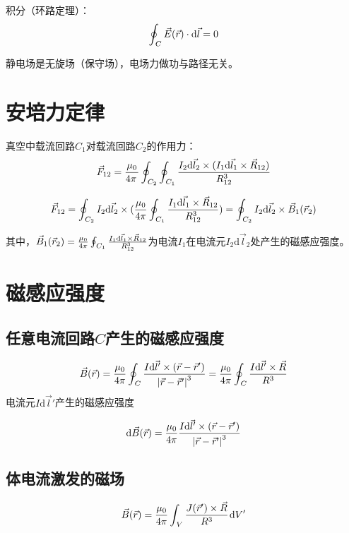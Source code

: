 积分（环路定理）：$$\oint_{{\kern 1pt} C} {\vec E{\rm{(}}\vec r{\rm{)}} \cdot {\rm{d}}\vec l}  = 0$$

静电场是无旋场（保守场），电场力做功与路径无关。


\section{安培力定律}
真空中载流回路$C_1$对载流回路$C_2$的作用力：
$${\vec F_{12}} = {{{\mu _0}} \over {4{\rm{\pi }}\,}}\oint_{{\kern 1pt} {C_2}} {\oint_{{\kern 1pt} {C_1}} {{{{I_2}{\rm{d}}{{\vec l}_2} \times ({I_1}{\rm{d}}{{\vec l}_1} \times {{\vec R}_{12}})} \over {R_{12}^3}}} } $$

$${\vec F_{12}} = \oint_{{\kern 1pt} {C_2}} {{I_2}{\rm{d}}{{\vec l}_2} \times ({{{\mu _0}} \over {4{\rm{\pi }}}}\oint_{{\kern 1pt} {C_1}} {{{{I_1}{\rm{d}}{{\vec l}_1} \times {{\vec R}_{12}}} \over {R_{12}^3}})} }  = \oint_{{\kern 1pt} {C_2}} {{I_2}{\rm{d}}{{\vec l}_2} \times {{\vec B}_1}({{\vec r}_2})} $$

其中，${\vec B_1}({\vec r_2}) = {{{\mu _0}} \over {4{\rm{\pi }}}}\oint_{{\kern 1pt} {C_1}} {{{{I_1}{\rm{d}}{{\vec l}_1} \times {{\vec R}_{12}}} \over {R_{12}^3}}} $为电流$I_1$在电流元$I_2\mathrm{d}\vec{l}_2$处产生的磁感应强度。

\section{磁感应强度}
\subsection*{任意电流回路$C$产生的磁感应强度}
$$\vec B(\vec r) = {{{\mu _0}} \over {4{\rm{\pi }}}}\oint_{{\kern 1pt} C} {{{I{\rm{d}}\vec l' \times (\vec r - \vec r')} \over {{{\left| {\vec r - \vec r'} \right|}^3}}}}  = {{{\mu _0}} \over {4{\rm{\pi }}}}\oint_{{\kern 1pt} C} {{{I{\rm{d}}\vec l' \times \vec R} \over {{R^3}}}} $$
电流元$I\mathrm{d}\vec{l}'$产生的磁感应强度

$${\rm{d}}\vec B(\vec r) = {{{\mu _0}} \over {4{\rm{\pi }}}}{{I{\rm{d}}\vec l' \times (\vec r - \vec r')} \over {{{\left| {\vec r - \vec r'} \right|}^3}}}$$

\subsection*{体电流激发的磁场}
$$\vec B(\vec r) = {{{\mu _0}} \over {4{\rm{\pi }}}}\int_{{\kern 1pt} V} {{{J{\rm{(}}\vec r') \times \vec R} \over {{R^3}}}{\kern 1pt} } {\rm{d}}V'$$

